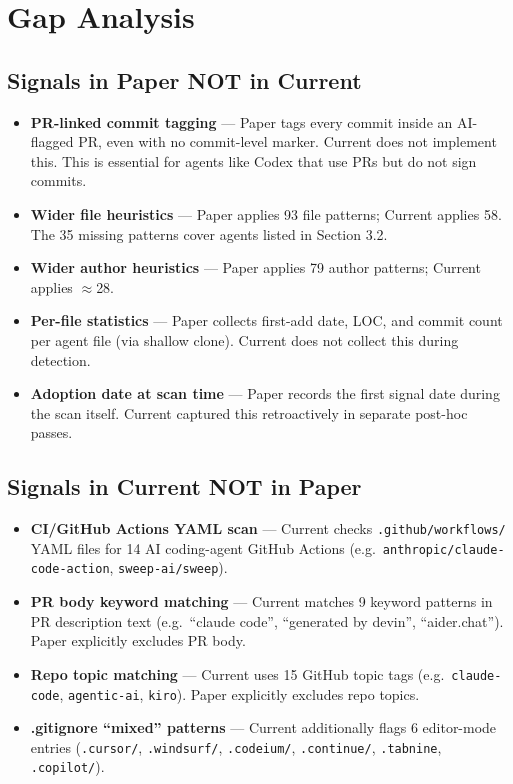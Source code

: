 \documentclass[10pt,a4paper]{article}
\begin{document}
\newpage
\section{Gap Analysis}

\subsection{Signals in Paper NOT in Current}
\begin{itemize}
  \item \textbf{PR-linked commit tagging} — Paper tags every commit inside an AI-flagged PR, even with no commit-level marker. Current does not implement this. This is essential for agents like Codex that use PRs but do not sign commits.
  \item \textbf{Wider file heuristics} — Paper applies 93 file patterns; Current applies 58. The 35 missing patterns cover agents listed in Section 3.2.
  \item \textbf{Wider author heuristics} — Paper applies 79 author patterns; Current applies $\approx$28.
  \item \textbf{Per-file statistics} — Paper collects first-add date, LOC, and commit count per agent file (via shallow clone). Current does not collect this during detection.
  \item \textbf{Adoption date at scan time} — Paper records the first signal date during the scan itself. Current captured this retroactively in separate post-hoc passes.
\end{itemize}

\subsection{Signals in Current NOT in Paper}
\begin{itemize}
  \item \textbf{CI/GitHub Actions YAML scan} — Current checks \texttt{.github/workflows/} YAML files for 14 AI coding-agent GitHub Actions (e.g.\ \texttt{anthropic/claude-code-action}, \texttt{sweep-ai/sweep}).
  \item \textbf{PR body keyword matching} — Current matches 9 keyword patterns in PR description text (e.g.\ ``claude code'', ``generated by devin'', ``aider.chat''). Paper explicitly excludes PR body.
  \item \textbf{Repo topic matching} — Current uses 15 GitHub topic tags (e.g.\ \texttt{claude-code}, \texttt{agentic-ai}, \texttt{kiro}). Paper explicitly excludes repo topics.
  \item \textbf{.gitignore ``mixed'' patterns} — Current additionally flags 6 editor-mode entries (\texttt{.cursor/}, \texttt{.windsurf/}, \texttt{.codeium/}, \texttt{.continue/}, \texttt{.tabnine}, \texttt{.copilot/}).
\end{itemize}
\end{document}
